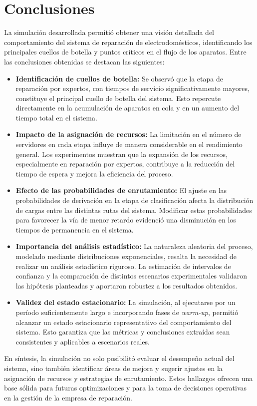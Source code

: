 \documentclass[a4paper,12pt]{article}
\begin{document}
\section{Conclusiones}

La simulación desarrollada permitió obtener una visión detallada del comportamiento del sistema de reparación de electrodomésticos, identificando los principales cuellos de botella y puntos críticos en el flujo de los aparatos. Entre las conclusiones obtenidas se destacan las siguientes:

\begin{itemize}
    \item \textbf{Identificación de cuellos de botella:}  
    Se observó que la etapa de reparación por expertos, con tiempos de servicio significativamente mayores, constituye el principal cuello de botella del sistema. Esto repercute directamente en la acumulación de aparatos en cola y en un aumento del tiempo total en el sistema.

    \item \textbf{Impacto de la asignación de recursos:}  
    La limitación en el número de servidores en cada etapa influye de manera considerable en el rendimiento general. Los experimentos muestran que la expansión de los recursos, especialmente en reparación por expertos, contribuye a la reducción del tiempo de espera y mejora la eficiencia del proceso.

    \item \textbf{Efecto de las probabilidades de enrutamiento:}  
    El ajuste en las probabilidades de derivación en la etapa de clasificación afecta la distribución de cargas entre las distintas rutas del sistema. Modificar estas probabilidades para favorecer la vía de menor retardo evidenció una disminución en los tiempos de permanencia en el sistema.

    \item \textbf{Importancia del análisis estadístico:}  
    La naturaleza aleatoria del proceso, modelado mediante distribuciones exponenciales, resalta la necesidad de realizar un análisis estadístico riguroso. La estimación de intervalos de confianza y la comparación de distintos escenarios experimentales validaron las hipótesis planteadas y aportaron robustez a los resultados obtenidos.

    \item \textbf{Validez del estado estacionario:}  
    La simulación, al ejecutarse por un período suficientemente largo e incorporando fases de \emph{warm-up}, permitió alcanzar un estado estacionario representativo del comportamiento del sistema. Esto garantiza que las métricas y conclusiones extraídas sean consistentes y aplicables a escenarios reales.
\end{itemize}

En síntesis, la simulación no solo posibilitó evaluar el desempeño actual del sistema, sino también identificar áreas de mejora y sugerir ajustes en la asignación de recursos y estrategias de enrutamiento. Estos hallazgos ofrecen una base sólida para futuras optimizaciones y para la toma de decisiones operativas en la gestión de la empresa de reparación.
\end{document}
